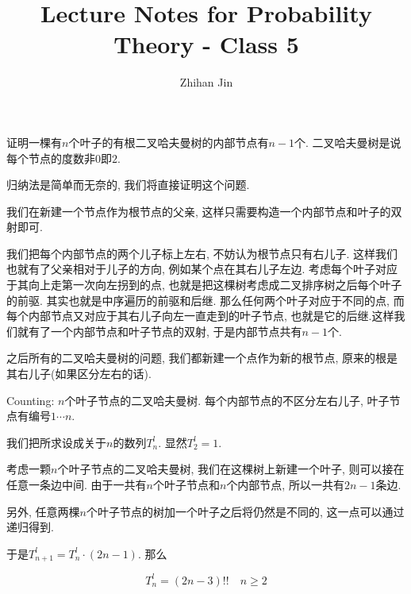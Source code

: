 

\title{Lecture Notes for Probability Theory - Class 5}
\author{Zhihan Jin}
\date{}


	\maketitle
	\newpage
	
	\begin{prob} [二叉树$\uppercase\expandafter{\romannumeral1}$]
		
		证明一棵有$n$个叶子的有根二叉哈夫曼树的内部节点有$n - 1$个. 二叉哈夫曼树是说每个节点的度数非$0$即$2$.
	
		\sol
		归纳法是简单而无奈的, 我们将直接证明这个问题.
		
		我们在新建一个节点作为根节点的父亲, 这样只需要构造一个内部节点和叶子的双射即可.
		
		我们把每个内部节点的两个儿子标上左右, 不妨认为根节点只有右儿子. 这样我们也就有了父亲相对于儿子的方向, 例如某个点在其右儿子左边. 考虑每个叶子对应于其向上走第一次向左拐到的点, 也就是把这棵树考虑成二叉排序树之后每个叶子的前驱. 其实也就是中序遍历的前驱和后继. 那么任何两个叶子对应于不同的点, 而每个内部节点又对应于其右儿子向左一直走到的叶子节点, 也就是它的后继.这样我们就有了一个内部节点和叶子节点的双射, 于是内部节点共有$n - 1$个.
		
	\end{prob}

	之后所有的二叉哈夫曼树的问题, 我们都新建一个点作为新的根节点, 原来的根是其右儿子(如果区分左右的话).

	\begin{prob} [二叉树$\uppercase\expandafter{\romannumeral2}$]
		
		Counting: $n$个叶子节点的二叉哈夫曼树. 每个内部节点的不区分左右儿子, 叶子节点有编号$1\cdots n$.
		
		\sol
		我们把所求设成关于$n$的数列$T_n^l$. 显然$T_2^l = 1$.
		
		考虑一颗$n$个叶子节点的二叉哈夫曼树, 我们在这棵树上新建一个叶子, 则可以接在任意一条边中间. 由于一共有$n$个叶子节点和$n$个内部节点, 所以一共有$2n-1$条边. 
		
		另外, 任意两棵$n$个叶子节点的树加一个叶子之后将仍然是不同的, 这一点可以通过递归得到.
		
		于是$T_{n + 1}^l = T_n^l \cdot (2n - 1)$. 那么
		
		\begin{equation*}
			T_n^l = (2n - 3)!! \quad n \geq 2
		\end{equation*}
		
	\end{prob}

